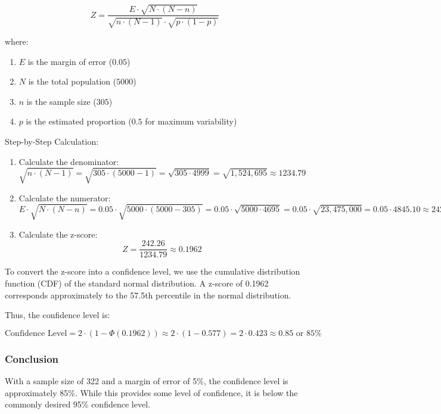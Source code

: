 \[
Z = \frac{E \cdot \sqrt{N \cdot (N - n)}}{\sqrt{n \cdot (N - 1)} \cdot \sqrt{p \cdot (1 - p)}}
\]

where:

\begin{enumerate}
    \item[] \( E \) is the margin of error ($0.05$)
    \item[] \( N \) is the total population ($5000$)
    \item[] \( n \) is the sample size ($305$)
    \item[] \( p \) is the estimated proportion ($0.5$ for maximum variability)
\end{enumerate}

Step-by-Step Calculation:

\begin{enumerate}
    \item Calculate the denominator:
    \[
        \sqrt{n \cdot (N - 1)} = \sqrt{305 \cdot (5000 - 1)} = \sqrt{305 \cdot 4999} = \sqrt{1,524,695} \approx 1234.79
    \]

    \item Calculate the numerator:
    \[
        E \cdot \sqrt{N \cdot (N - n)} = 0.05 \cdot \sqrt{5000 \cdot (5000 - 305)} = 0.05 \cdot \sqrt{5000 \cdot 4695} = 0.05 \cdot \sqrt{23,475,000} = 0.05 \cdot 4845.10 \approx 242.26
    \]

    \item Calculate the z-score:
    \[
        Z = \frac{242.26}{1234.79} \approx 0.1962
    \]
\end{enumerate}

To convert the z-score into a confidence level, we use the cumulative distribution function (CDF) of the standard normal distribution. A z-score of 0.1962 corresponds approximately to the 57.5th percentile in the normal distribution.

Thus, the confidence level is:

\[
    \text{Confidence Level} = 2 \cdot (1 - \Phi(0.1962)) \approx 2 \cdot (1 - 0.577) = 2 \cdot 0.423 \approx 0.85 \text{ or } 85\%
\]

\subsubsection*{Conclusion}

With a sample size of 322 and a margin of error of 5\%, the confidence level is approximately 85\%. While this provides some level of confidence, it is below the commonly desired 95\% confidence level. 

